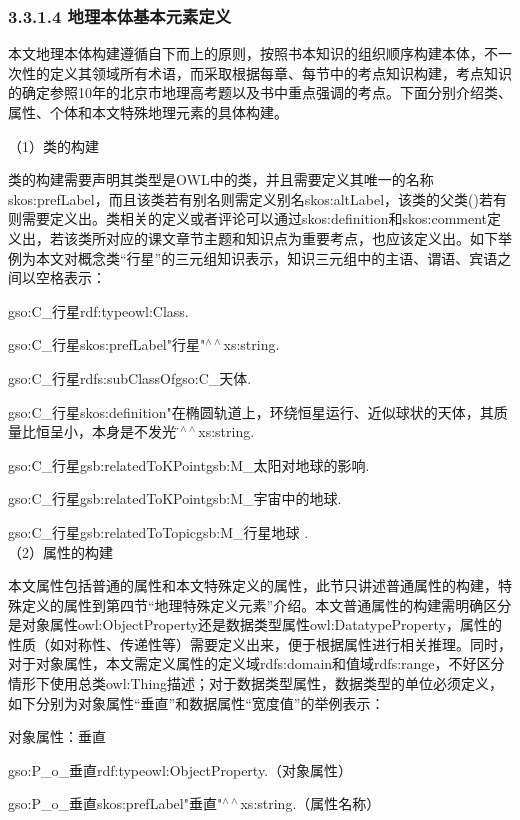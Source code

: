 \subsubsection{3.3.1.4 地理本体基本元素定义}
本文地理本体构建遵循自下而上的原则，按照书本知识的组织顺序构建本体，不一次性的定义其领域所有术语，而采取根据每章、每节中的考点知识构建，考点知识的确定参照10年的北京市地理高考题以及书中重点强调的考点。下面分别介绍类、属性、个体和本文特殊地理元素的具体构建。

（1）类的构建

类的构建需要声明其类型是OWL中的类，并且需要定义其唯一的名称skos:prefLabel，而且该类若有别名则需定义别名skos:altLabel，该类的父类()若有则需要定义出。类相关的定义或者评论可以通过skos:definition和skos:comment定义出，若该类所对应的课文章节主题和知识点为重要考点，也应该定义出。如下举例为本文对概念类“行星”的三元组知识表示，知识三元组中的主语、谓语、宾语之间以空格表示：

gso:C\_行星\quad rdf:type\quad owl:Class\quad .

gso:C\_行星\quad skos:prefLabel\quad "行星"$^{\land\land}$xs:string\quad .

gso:C\_行星\quad rdfs:subClassOf\quad gso:C\_天体\quad .

gso:C\_行星\quad skos:definition\quad "在椭圆轨道上，环绕恒星运行、近似球状的天体，其质量比恒呈小，本身是不发光的\"$^{\land\land}$xs:string\quad .

gso:C\_行星\quad gsb:relatedToKPoint\quad gsb:M\_太阳对地球的影响\quad .

gso:C\_行星\quad gsb:relatedToKPoint\quad gsb:M\_宇宙中的地球\quad .

gso:C\_行星\quad gsb:relatedToTopic\quad gsb:M\_行星地球 .
\\

（2）属性的构建 

本文属性包括普通的属性和本文特殊定义的属性，此节只讲述普通属性的构建，特殊定义的属性到第四节“地理特殊定义元素”介绍。本文普通属性的构建需明确区分是对象属性owl:ObjectProperty还是数据类型属性owl:DatatypeProperty，属性的性质（如对称性、传递性等）需要定义出来，便于根据属性进行相关推理。同时，对于对象属性，本文需定义属性的定义域rdfs:domain和值域rdfs:range，不好区分情形下使用总类owl:Thing描述；对于数据类型属性，数据类型的单位必须定义，如下分别为对象属性“垂直”和数据属性“宽度值”的举例表示：

对象属性：垂直

gso:P\_o\_垂直\quad rdf:type\quad owl:ObjectProperty\quad .（对象属性）

gso:P\_o\_垂直\quad skos:prefLabel\quad "垂直"$^{\land\land}$xs:string\quad .（属性名称）

